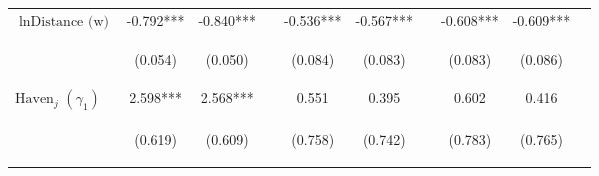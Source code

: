 \documentclass[twoside,a4paper,11pt]{article}
\begin{document}
\begin{table}
{\begin{tabular}{lccc|ccc|ccc}
			$\ln\text{Distance (w)}$ & -0.792*** & -0.840*** &  & -0.536*** & -0.567*** &  & -0.608*** & -0.609*** &  \\
			\vspace{4pt} & \begin{footnotesize}(0.054)\end{footnotesize} & \begin{footnotesize}(0.050)\end{footnotesize} & \begin{footnotesize}\end{footnotesize} & \begin{footnotesize}(0.084)\end{footnotesize} & \begin{footnotesize}(0.083)\end{footnotesize} & \begin{footnotesize}\end{footnotesize} & \begin{footnotesize}(0.083)\end{footnotesize} & \begin{footnotesize}(0.086)\end{footnotesize} & \begin{footnotesize}\end{footnotesize} \\
			$\text{Haven}_j$ $(\gamma_1)$ & 2.598*** & 2.568*** &  & 0.551 & 0.395 &  & 0.602 & 0.416 &  \\
			\vspace{4pt} & \begin{footnotesize}(0.619)\end{footnotesize} & \begin{footnotesize}(0.609)\end{footnotesize} & \begin{footnotesize}\end{footnotesize} & \begin{footnotesize}(0.758)\end{footnotesize} & \begin{footnotesize}(0.742)\end{footnotesize} & \begin{footnotesize}\end{footnotesize} & \begin{footnotesize}(0.783)\end{footnotesize} & \begin{footnotesize}(0.765)\end{footnotesize} & \begin{footnotesize}\end{footnotesize} \\

\end{tabular}}
\end{table}
\end{document}
